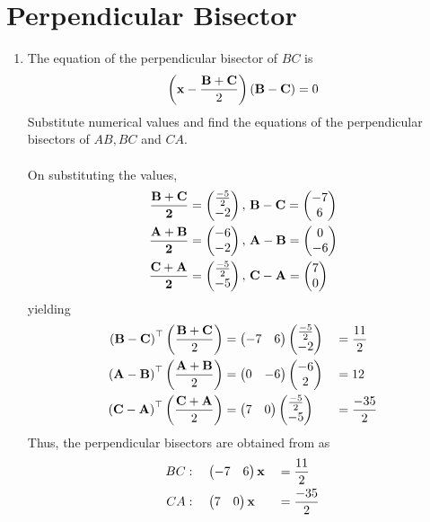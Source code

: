 \documentclass[11pt]{book}
\begin{document}
\section{Perpendicular Bisector}
\begin{enumerate}[label=\thesection.\arabic*.,ref=\thesection.\theenumi]

\item The equation of the perpendicular bisector of $BC$ is
		\begin{align}
			\label{eq:tri-perp-bisect}
			\brak{\vec{x}-\frac{\vec{B}+\vec{C}}{2}}\brak{\vec{B}-\vec{C}} = 0
		\end{align}
		Substitute numerical values and find the equations of the perpendicular bisectors of $AB, BC$ and $CA$.\\
\solution\\
On substituting the values,
\begin{align}
\mathbf{\frac{\mathbf{B}+\mathbf{C}}{2}} &= \begin{pmatrix}\frac{-5}{2} \\ -2\end{pmatrix},\,
\mathbf{B}-\mathbf{C} = \begin{pmatrix}-7 \\ 6\end{pmatrix} 
\\
\mathbf{\frac{\mathbf{A}+\mathbf{B}}{2}} &= \begin{pmatrix}-6 \\ -2\end{pmatrix},\,
\mathbf{A}-\mathbf{B}=\begin{pmatrix}0 \\ -6\end{pmatrix} \\
\mathbf{\frac{\mathbf{C}+\mathbf{A}}{2}} &= \begin{pmatrix}\frac{-5}{2} \\ -5\end{pmatrix},\,
\mathbf{C}-\mathbf{A} = \begin{pmatrix}7 \\ 0\end{pmatrix} \\
\end{align}
yielding
\begin{alignat}{2}
  \left(\mathbf{B}-\mathbf{C}\right)^{\top}\left(\frac{\mathbf{B}+\mathbf{C}}{2}\right) 
	&= \begin{pmatrix}-7 & 6\end{pmatrix}\begin{pmatrix}\frac{-5}{2} \\ -2\end{pmatrix}
	&&= \frac{11}{2}
  \\
\left(\mathbf{A}-\mathbf{B}\right)^{\top}\left(\frac{\mathbf{A}+\mathbf{B}}{2}\right)
	&= \begin{pmatrix}0 & -6\end{pmatrix}\begin{pmatrix}-6 \\ 2\end{pmatrix}
	&&= 12
  \\
\left(\mathbf{C}-\mathbf{A}\right)^{\top}\left(\frac{\mathbf{C}+\mathbf{A}}{2}\right)
	&= \begin{pmatrix}7 & 0\end{pmatrix}\begin{pmatrix}\frac{-5}{2} \\ -5\end{pmatrix}
	&&= \frac{-35}{2}
\end{alignat}
Thus, the perpendicular bisectors are obtained from as
		\begin{alignat}{2}
			BC&: \quad \myvec{-7 & 6}\vec{x} &&= \frac{11}{2}\\
			CA&: \quad \myvec{7 & 0}\vec{x} &&= \frac{-35}{2}\\

\end{alignat}
\end{enumerate}
\end{document}

